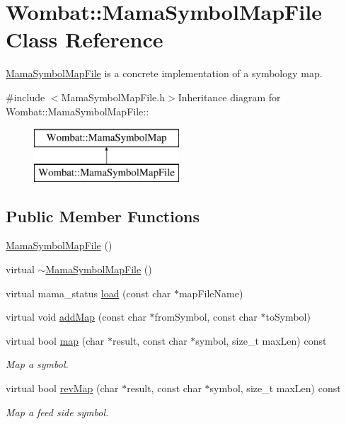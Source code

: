 \hypertarget{classWombat_1_1MamaSymbolMapFile}{
\section{Wombat::MamaSymbolMapFile Class Reference}
\label{classWombat_1_1MamaSymbolMapFile}
}


\hyperlink{classWombat_1_1MamaSymbolMapFile}{MamaSymbolMapFile} is a concrete implementation of a symbology map.  


{\ttfamily \#include $<$MamaSymbolMapFile.h$>$}Inheritance diagram for Wombat::MamaSymbolMapFile::\begin{figure}[H]
\begin{center}
\leavevmode
\includegraphics[height=2cm]{classWombat_1_1MamaSymbolMapFile}
\end{center}
\end{figure}
\subsection*{Public Member Functions}
\begin{DoxyCompactItemize}
\item 
\hyperlink{classWombat_1_1MamaSymbolMapFile_ae60584e1e114cb7ec1198dcc88e8852a}{MamaSymbolMapFile} ()
\item 
virtual \hyperlink{classWombat_1_1MamaSymbolMapFile_aa7382158180b5239cc57450a8f88385c}{$\sim$MamaSymbolMapFile} ()
\item 
virtual mama\_\-status \hyperlink{classWombat_1_1MamaSymbolMapFile_a1a3f81e006bb46a98cb0920308d7c667}{load} (const char $\ast$mapFileName)
\item 
virtual void \hyperlink{classWombat_1_1MamaSymbolMapFile_ae5126c3985633b7bf9c7f5b06d505e45}{addMap} (const char $\ast$fromSymbol, const char $\ast$toSymbol)
\item 
virtual bool \hyperlink{classWombat_1_1MamaSymbolMapFile_afbc6713633e4748ce4d35c9fbaac2721}{map} (char $\ast$result, const char $\ast$symbol, size\_\-t maxLen) const 
\begin{DoxyCompactList}\small\item\em Map a symbol. \item\end{DoxyCompactList}\item 
virtual bool \hyperlink{classWombat_1_1MamaSymbolMapFile_a5547093417653f35d964c39f7e806374}{revMap} (char $\ast$result, const char $\ast$symbol, size\_\-t maxLen) const 
\begin{DoxyCompactList}\small\item\em Map a feed side symbol. \item\end{DoxyCompactList}\end{DoxyCompactItemize}


